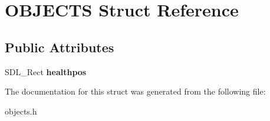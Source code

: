 \hypertarget{structOBJECTS}{}\section{O\+B\+J\+E\+C\+TS Struct Reference}
\label{structOBJECTS}
\subsection*{Public Attributes}
\begin{DoxyCompactItemize}
\item 
S\+D\+L\+\_\+\+Rect {\bfseries healthpos}\hypertarget{structOBJECTS_a441b7936e880d46576abbd5cab6ebd5f}{}\label{structOBJECTS_a441b7936e880d46576abbd5cab6ebd5f}

\end{DoxyCompactItemize}


The documentation for this struct was generated from the following file\+:\begin{DoxyCompactItemize}
\item 
objects.\+h\end{DoxyCompactItemize}
